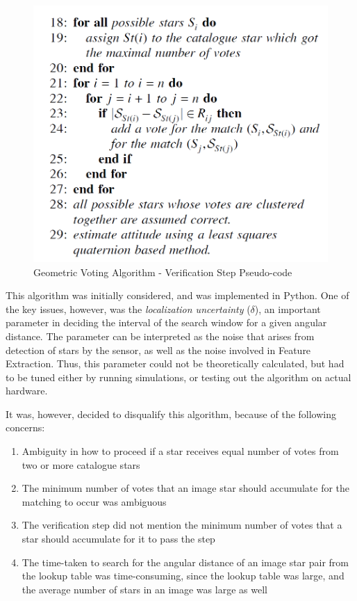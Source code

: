 \documentclass[../../main.tex]{subfiles}
\begin{document}
\begin{figure}[h!]
    \centering
    \includegraphics[scale=0.45]{Figures/GNC/GVM_Voting_Method.PNG}
    \caption{Geometric Voting Algorithm - Verification Step Pseudo-code}
    \label{fig:GVM_verification}
\end{figure}

This algorithm was initially considered, and was implemented in Python.
One of the key issues, however, was the \textit{localization uncertainty} ($\delta$), an important parameter in deciding the interval of the search window for a given angular distance. 
The parameter can be interpreted as the noise that arises from detection of stars by the sensor, as well as the noise involved in Feature Extraction. Thus, this parameter could not be theoretically calculated, but had to be tuned either by running simulations, or testing out the algorithm on actual hardware.

It was, however, decided to disqualify this algorithm, because of the following concerns:
\begin{enumerate}
    \item Ambiguity in how to proceed if a star receives equal number of votes from two or more catalogue stars
    
    \item The minimum number of votes that an image star should accumulate for the matching to occur was ambiguous
    
    \item The verification step did not mention the minimum number of votes that a star should accumulate for it to pass the step
    
    \item The time-taken to search for the angular distance of an image star pair from the lookup table was time-consuming, since the lookup table was large, and the average number of stars in an image was large as well 
\end{enumerate}
\end{document}
